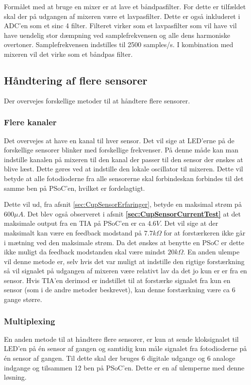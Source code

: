 \documentclass[HardwareDesign/HardwareDesign_main.tex]{subfiles}
\begin{document}
Formålet med at bruge en mixer er at lave et båndpasfilter. For dette er tilfældet skal der på udgangen af mixeren være et lavpasfilter. Dette er også inkluderet i ADC'en som et sinc 4 filter. Filteret virker som et lavpasfilter som vil have vil have uendelig stor dæmpning ved samplefrekvensen og alle dens harmoniske overtoner. Samplefrekvensen indstilles til 2500 samples/s. I kombination med mixeren vil det virke som et båndpas filter.  


\subsection{Håndtering af flere sensorer}

Der overvejes forskellige metoder til at håndtere flere sensorer.
\subsubsection{Flere kanaler}
Det overvejes at have en kanal til hver sensor. Det vil sige at LED'erne på de forskellige sensorer blinker med forskellige frekvenser. På denne måde kan man indstille kanalen på mixeren til den kanal der passer til den sensor der ønskes at blive læst. Dette gøres ved at indstille den lokale oscillator til mixeren. Dette vil betyde at alle fotodioderne fra alle sensorerne skal forbindeskan forbindes til det samme ben på PSoC'en, hvilket er fordelagtigt.

Dette vil ud, fra afsnit \ref{sec:CupSensorErfaringer}, betyde en maksimal strøm på $600\si{\mu A}$. Det blev også observeret i afsnit \textbf{\ref{sec:CupSensorCurrentTest}} at det maksimale output fra en TIA på PSoC'en er ca $4.6\si{V}$. Det vil sige at der maksimalt kan være en feedback modstand på $7.7\si{k\Omega}$ for at forstærkeren ikke går i mætning ved den maksimale strøm. Da det ønskes at benytte en PSoC er dette ikke muligt da feedback modstanden skal være mindst $20\si{k\Omega}$. En anden ulempe vil denne metode er, selv hvis det var muligt at indstille den rigtige forstærkning så vil signalet på udgangen af mixeren være relativt lav da det jo kun er er fra en sensor. Hvis TIA'en derimod er indstillet til at forstærke signalet fra kun en sensor (som i de andre metoder beskrevet), kan denne forstærkning være ca 6 gange større.  

\subsubsection{Multiplexing}
En anden metode til at håndtere flere sensorer, er kun at sende kloksignalet til LED'en på én sensor af gangen og samtidig kun måle signalet fra fotodioderne på én sensor af gangen. Til dette skal der bruges 6 digitale udgange og 6 analoge indgange og tilsammen 12 ben på PSoC'en. Dette er en af ulemperne med denne løsning.
\end{document}
